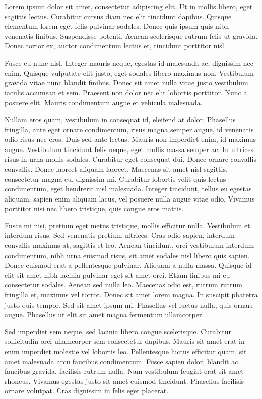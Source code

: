 \documentclass[landscape,12pt]{article}
\begin{document}
\newpage

Lorem ipsum dolor sit amet, consectetur adipiscing elit. Ut in mollis libero, eget sagittis lectus. Curabitur cursus diam nec elit tincidunt dapibus. Quisque elementum lorem eget felis pulvinar sodales. Donec quis ipsum quis nibh venenatis finibus. Suspendisse potenti. Aenean scelerisque rutrum felis ut gravida. Donec tortor ex, auctor condimentum lectus et, tincidunt porttitor nisl.

Fusce eu nunc nisl. Integer mauris neque, egestas id malesuada ac, dignissim nec enim. Quisque vulputate elit justo, eget sodales libero maximus non. Vestibulum gravida vitae nunc blandit finibus. Donec sit amet nulla vitae justo vestibulum iaculis accumsan et sem. Praesent non dolor nec elit lobortis porttitor. Nunc a posuere elit. Mauris condimentum augue et vehicula malesuada.

Nullam eros quam, vestibulum in consequat id, eleifend at dolor. Phasellus fringilla, ante eget ornare condimentum, risus magna semper augue, id venenatis odio risus nec eros. Duis sed ante lectus. Mauris non imperdiet enim, id maximus augue. Vestibulum tincidunt felis neque, eget mollis massa semper ac. In ultrices risus in urna mollis sodales. Curabitur eget consequat dui. Donec ornare convallis convallis. Donec laoreet aliquam laoreet. Maecenas sit amet nisl sagittis, consectetur magna eu, dignissim mi. Curabitur lobortis velit quis lectus condimentum, eget hendrerit nisl malesuada. Integer tincidunt, tellus eu egestas aliquam, sapien enim aliquam lacus, vel posuere nulla augue vitae odio. Vivamus porttitor nisi nec libero tristique, quis congue eros mattis.

Fusce mi nisi, pretium eget metus tristique, mollis efficitur nulla. Vestibulum et interdum risus. Sed venenatis pretium ultrices. Cras odio sapien, interdum convallis maximus at, sagittis et leo. Aenean tincidunt, orci vestibulum interdum condimentum, nibh urna euismod risus, sit amet sodales nisl libero quis sapien. Donec euismod erat a pellentesque pulvinar. Aliquam a nulla massa. Quisque id elit sit amet nibh lacinia pulvinar eget sit amet orci. Etiam finibus mi eu consectetur sodales. Aenean sed nulla leo. Maecenas odio est, rutrum rutrum fringilla et, maximus vel tortor. Donec sit amet lorem magna. In suscipit pharetra justo quis tempor. Sed sit amet ipsum mi. Phasellus vel luctus nulla, quis ornare augue. Phasellus ut elit sit amet magna fermentum ullamcorper.

Sed imperdiet sem neque, sed lacinia libero congue scelerisque. Curabitur sollicitudin orci ullamcorper sem consectetur dapibus. Mauris sit amet erat in enim imperdiet molestie vel lobortis leo. Pellentesque luctus efficitur quam, sit amet malesuada arcu faucibus condimentum. Fusce sapien dolor, blandit ac faucibus gravida, facilisis rutrum nulla. Nam vestibulum feugiat erat sit amet rhoncus. Vivamus egestas justo sit amet euismod tincidunt. Phasellus facilisis ornare volutpat. Cras dignissim in felis eget placerat.
\end{document}
